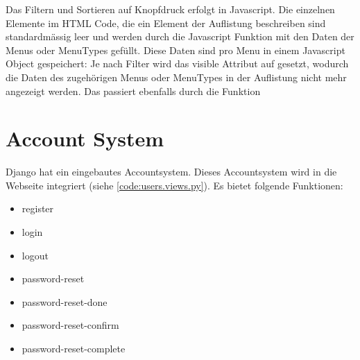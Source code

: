 Das Filtern und Sortieren auf Knopfdruck erfolgt in Javascript. Die einzelnen
 Elemente im HTML Code, die ein Element der Auflistung beschreiben
sind standardmässig leer und werden durch die Javascript Funktion
 mit den Daten der Menus oder MenuTypes gefüllt. Diese Daten sind pro
Menu in einem Javascript Object gespeichert:
\newline \newline
{}
Je nach Filter wird das visible Attribut auf  gesetzt, wodurch die
Daten des zugehörigen Menus oder MenuTypes in der Auflistung nicht mehr
angezeigt werden. Das passiert ebenfalls durch die  Funktion








\section{Account System} \label{spez:Account}

Django hat ein eingebautes Accountsystem. Dieses Accountsystem wird in die
Webseite integriert (siehe \ref{code:users.views.py}). Es bietet folgende Funktionen:
\begin{itemize}
    \item register
    \item login
    \item logout
    \item password-reset
    \item password-reset-done
    \item password-reset-confirm
    \item password-reset-complete
\end{itemize}

